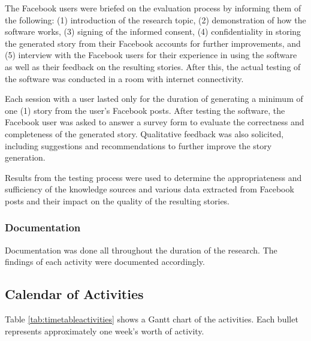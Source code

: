 The Facebook users were briefed on the evaluation process by informing them of the following: (1) introduction of the research topic, (2) demonstration of how the software works, (3) signing of the informed consent, (4) confidentiality in storing the generated story from their Facebook accounts for further improvements, and (5) interview with the Facebook users for their experience in using the software as well as their feedback on the resulting stories. After this, the actual testing of the software was conducted in a room with internet connectivity. 

Each session with a user lasted only for the duration of generating a minimum of one (1) story from the user's Facebook posts. After testing the software, the Facebook user was asked to answer a survey form to evaluate the correctness and completeness of the generated story. Qualitative feedback was also solicited, including suggestions and recommendations to further improve the story generation.

Results from the testing process were used to determine the appropriateness and sufficiency of the knowledge sources and various data extracted from Facebook posts and their impact on the quality of the resulting stories.

\subsubsection{Documentation}
Documentation was done all throughout the duration of the research. The findings of each activity were documented accordingly.

\subsection{Calendar of Activities}

Table \ref{tab:timetableactivities} shows a Gantt chart of the activities. Each bullet represents approximately one week's worth of activity.

%
%
\newcommand{\weekone}{\textbullet}
\newcommand{\weektwo}{\textbullet \textbullet}
\newcommand{\weekthree}{\textbullet \textbullet \textbullet}
\newcommand{\weekfour}{\textbullet \textbullet \textbullet \textbullet}

